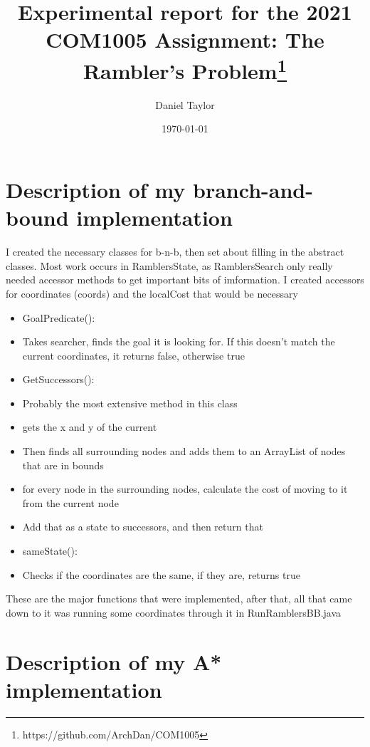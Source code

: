 \documentclass[11pt,oneside]{article}
\title{Experimental report for the 2021 COM1005 Assignment: The Rambler's Problem\footnote{https://github.com/ArchDan/COM1005}}
\author{Daniel Taylor}
\date{\today}
\begin{document}
\maketitle

\section{Description of my branch-and-bound implementation}
I created the necessary classes for b-n-b, then set about filling in the abstract classes.
Most work occurs in RamblersState, as RamblersSearch only really needed accessor methods to get important bits of imformation.
I created accessors for coordinates (coords) and the localCost that would be necessary
\begin{itemize}
\item GoalPredicate():
\item Takes searcher, finds the goal it is looking for. If this doesn't match the current coordinates, it returns false, otherwise true
\end{itemize}

\begin{itemize}
	\item GetSuccessors():
	\item Probably the most extensive method in this class
	\item gets the x and y of the current 
	\item Then finds all surrounding nodes and adds them to an ArrayList of nodes that are in bounds
	\item for every node in the surrounding nodes, calculate the cost of moving to it from the current node
	\item Add that as a state to successors, and then return that
\end{itemize}

\begin{itemize}
	\item sameState():
	\item Checks if the coordinates are the same, if they are, returns true
\end{itemize}
	
These are the major functions that were implemented, after that, all that came down to it was running some coordinates through it in RunRamblersBB.java

\section{Description of my A* implementation}
\end{document}
